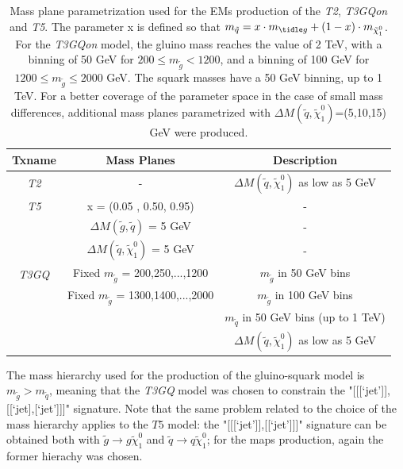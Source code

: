 \documentclass[a4paper,11pt]{article}
\begin{document}
\begin{table}[!htbp]
\footnotesize
\begin{center}
\renewcommand{\arraystretch}{1.4}
\begin{tabular}{ c c c} 
\toprule 
  \textbf{Txname} & \textbf{Mass Planes} & \textbf{Description} \\ \toprule \toprule
  \textit{T2} & - & $\Delta M(\tilde q, \tilde \chi _1 ^0)$ as low as 5 GeV \\ \midrule
  \textit{T5} & x = (0.05 , 0.50, 0.95) & - \\
       &  $\Delta M(\tilde g, \tilde q )$ = 5 GeV & - \\
       &  $\Delta M(\tilde q, \tilde \chi _1 ^0)$ = 5 GeV        & - \\ \midrule
  \textit{T3GQ}  & Fixed $m_{\tilde g}$ = 200,250,...,1200       &  $m_{\tilde g}$ in 50 GeV bins \\ 
                 & Fixed $m_{\tilde g}$ = 1300,1400,...,2000    &  $m_{\tilde g}$ in  100 GeV bins \\
                 &                                                                                                                  & $m_{\tilde q}$ in 50 GeV bins (up to 1 TeV) \\
                 &                                                                                                                         &  $\Delta M(\tilde q, \tilde \chi _1 ^0)$ as low as 5 GeV \\ 
\bottomrule \bottomrule
\end{tabular}
\end{center}
\caption{Mass plane parametrization used for the EMs production of the \textit{T2}, \textit{T3GQon} and \textit{T5}. The parameter x is defined so that $m_{\tilde q}= x\cdot m_{\tidle g} + (1-x)\cdot m_{\tilde \chi_1 ^0}$. For the \textit{T3GQon} model, the gluino mass reaches the value of 2 TeV, with a binning of 50 GeV for $200 \leq m_{\tilde g} < 1200$, and a binning of 100 GeV for $1200 \leq m_{\tilde g}  \leq 2000$ GeV. The squark masses have a 50 GeV binning, up to 1 TeV. For a better coverage of the parameter space in the case of small mass differences, additional mass planes parametrized with $\Delta M ( \tilde q, \tilde \chi _1 ^0)$=(5,10,15) GeV were produced. }
\label{TGQ_Planes} 
\end{table}
%
%
The mass hierarchy used for the production of the gluino-squark model is $m_{\tilde g} > m_{\tilde q}$, meaning that the \textit{T3GQ} model was chosen to constrain the "[[[`jet']],[[`jet],[`jet']]]" signature. Note that the same problem related to the choice of the mass hierarchy applies to the $T5$ model: the "[[[`jet']],[[`jet']]]" signature can be obtained both with $\tilde g \rightarrow g \tilde \chi _1 ^0$ and $\tilde q \rightarrow q \tilde \chi _1 ^0$; for the maps production, again the former hierachy was chosen. 
\end{document}
